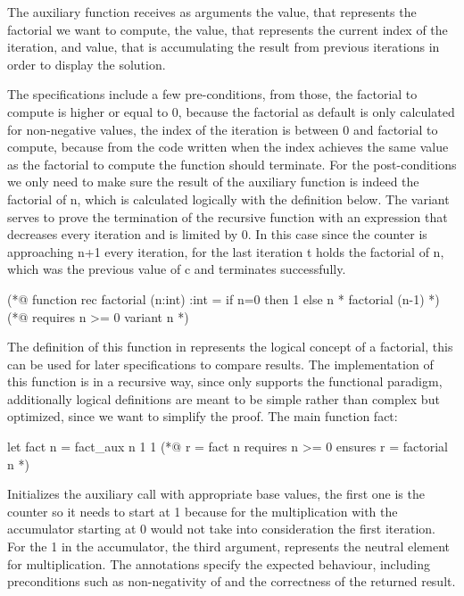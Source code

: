 The auxiliary function  receives as arguments the  value, that represents the factorial we want to 
compute, the  value, that represents the current index of the iteration, and  value, that is accumulating 
the result from previous iterations in order to display the solution.

The specifications include a few pre-conditions, from those, the factorial to compute is higher or equal to 0, because the factorial as 
default is only calculated for non-negative values, the index of the iteration is between 0 and factorial to compute, because from the
code written when the index achieves the same value as the factorial to compute the function should terminate. For the post-conditions
we only need to make sure the result of the auxiliary function is indeed the factorial of n, which is calculated logically with the 
definition below. The variant serves to prove the termination of the recursive function with an expression that decreases every iteration
and is limited by 0. In this case since the counter is approaching n+1 every iteration, for the last iteration t holds the factorial of n,
which was the previous value of c and terminates successfully.

\begin{gospell}
(*@ 
  function rec factorial (n:int) :int = 
    if n=0 then 1 else n * factorial (n-1)
*)
(*@ 
  requires n >= 0
  variant n
*)
\end{gospell}

The definition of this function in \gospel represents the logical concept of a factorial, this can be used for later specifications 
to compare results. The implementation of this function is in a recursive way, since \gospel only supports the functional paradigm, 
additionally logical definitions are meant to be simple rather than complex but optimized, since we want to simplify the proof.
The main function fact:

\begin{gospell}
let fact n = fact_aux n 1 1
(*@ 
  r = fact n
  requires n >= 0 
  ensures r = factorial n
*)
\end{gospell}

Initializes the auxiliary call with appropriate base values, the first one is the counter so it needs to start at 1 because for the 
multiplication with the accumulator starting at 0 would not take into consideration the first iteration. For the 1 in the accumulator, 
the third argument, represents the neutral element for multiplication. The \gospel annotations specify the expected behaviour, including 
preconditions such as non-negativity of  and the correctness of the returned result. 

